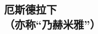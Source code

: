 \setlength\columnsep{0.6cm}
\begin{multicols}{2}

\chapter*{厄斯德拉下\\（亦称“乃赫米雅”）}

\rhead{}


\end{multicols}